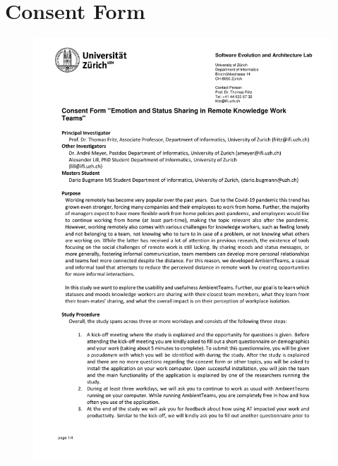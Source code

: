 \chapter{Consent Form}
\label{chapter:consent_form}

\begin{figure}[h]
    \centering
    \includegraphics[width=\linewidth, page=1]{./documents/consent_form.pdf}
\end{figure}

